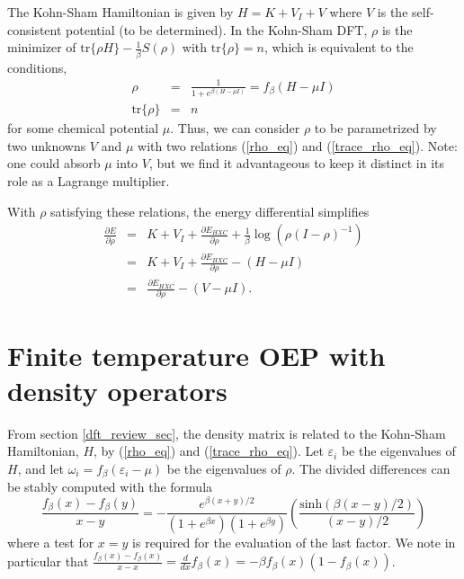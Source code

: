 \documentclass{article}
\newcommand{\beas}{\begin{eqnarray*}}
\newcommand{\enas}{\end{eqnarray*}}
\newcommand{\bea}{\begin{eqnarray}} \newcommand{\ena}{\end{eqnarray}}
\newcommand{\trace}{\mbox{tr}} \newcommand{\real}{\mathcal Re}
\newcommand{\Vscp}{V}
\begin{document}
The Kohn-Sham Hamiltonian is given by $H = K + V_I + \Vscp$ where
$\Vscp$ is the self-consistent potential (to be determined).
In the Kohn-Sham DFT, $\rho$ is the minimizer of
$\trace\{\rho H \} - \frac{1}{\beta} S(\rho)$
with $\trace\{\rho\}=n$, which is equivalent to the conditions,
\bea
\label{rho_eq}
  \rho &=& \frac{1}{1+e^{\beta (H - \mu I)}} = f_\beta(H-\mu I)\\
\label{trace_rho_eq}
  \trace\{\rho\} &=& n
\ena
for some chemical potential $\mu$.
Thus, we can consider $\rho$ to be parametrized by two unknowns
$\Vscp$ and $\mu$ with two relations (\ref{rho_eq}) and (\ref{trace_rho_eq}).
Note: one could absorb $\mu$ into $\Vscp$, but we find it
advantageous to keep it distinct in its role as a Lagrange multiplier.

With $\rho$ satisfying these relations, the energy differential simplifies
\beas
\frac{\partial E}{\partial \rho}
 &=&
 K + V_I + \frac{\partial E_{HXC}}{\partial \rho} +
 \frac{1}{\beta} \log(\rho(I-\rho)^{-1})\\
 &=&
 K + V_I + \frac{\partial E_{HXC}}{\partial \rho} 
 - (H - \mu I)\\
 &=& 
  \frac{\partial E_{HXC}}{\partial \rho} 
 - (\Vscp - \mu I).
\enas
\label{dft_review_sec}

\section{Finite temperature OEP with density operators}

From section \ref{dft_review_sec}, the density matrix is
related to the Kohn-Sham Hamiltonian, $H$, by (\ref{rho_eq}) and (\ref{trace_rho_eq}).
Let $\varepsilon_i$ be the eigenvalues of $H$, and let
$\omega_i = f_\beta (\varepsilon_i-\mu)$ be the eigenvalues of $\rho$.
The divided differences can be stably computed with the formula
$$\frac{f_{\beta}(x) - f_{\beta}(y)}{x-y} =
  -\frac{e^{\beta (x+y)/2}}{(1+e^{\beta x})(1+e^{\beta y})}
  \left(\frac{\mbox{sinh}(\beta (x-y)/2)}{(x-y)/2}\right)
$$
where a test for $x=y$ is required for the evaluation of
the last factor.  We note in particular that
$\frac{f_\beta(x)-f_\beta(x)}{x-x} = 
\frac{d}{dx}f_\beta(x) = -\beta f_\beta(x)(1-f_\beta(x))$.
\end{document}
